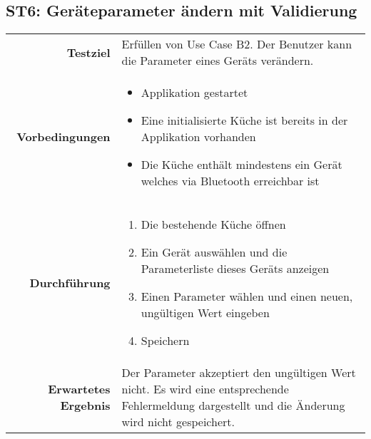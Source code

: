 \subsection{ST6: Geräteparameter ändern mit Validierung}
\begin{table}[H]
\begin{tabularx}{\textwidth}{r X }
\textbf{Testziel} & Erfüllen von Use Case B2. Der Benutzer kann die Parameter eines Geräts verändern. \\
\textbf{Vorbedingungen} & \begin{itemize}
\item Applikation gestartet
\item Eine initialisierte Küche ist bereits in der Applikation vorhanden
\item Die Küche enthält mindestens ein Gerät welches via Bluetooth erreichbar ist
\end{itemize} \\
\textbf{Durchführung} & \begin{enumerate}
\item Die bestehende Küche öffnen
\item Ein Gerät auswählen und die Parameterliste dieses Geräts anzeigen
\item Einen Parameter wählen und einen neuen, ungültigen Wert eingeben
\item Speichern
\end{enumerate} \\
\textbf{Erwartetes Ergebnis} & Der Parameter akzeptiert den ungültigen Wert nicht. Es wird eine entsprechende Fehlermeldung dargestellt und die Änderung wird nicht gespeichert.\\
\end{tabularx}
\end{table}

